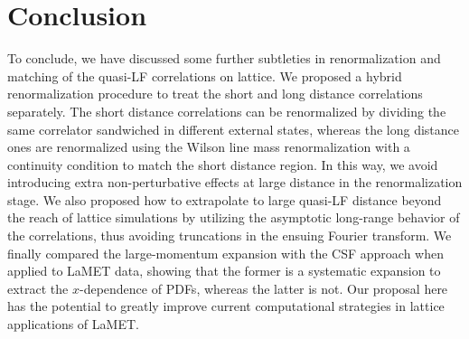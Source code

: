 \section{Conclusion}
\label{sec:conclusion}

To conclude, we have discussed some further subtleties in renormalization
and matching of the quasi-LF correlations on lattice. We proposed a hybrid renormalization procedure to treat the short and long distance correlations separately. The short distance correlations can be renormalized by dividing the same correlator sandwiched in different external states, whereas the long distance ones are renormalized using the Wilson line mass renormalization with a continuity condition to match the short distance region. In this way, we avoid introducing extra non-perturbative effects at large distance in the renormalization stage. We also proposed how to extrapolate to large quasi-LF distance beyond the reach of lattice simulations by utilizing the asymptotic long-range behavior of the correlations, thus avoiding truncations in the ensuing Fourier transform. We finally compared the large-momentum expansion with the CSF approach when applied to LaMET data, showing that the former is a systematic expansion to extract the $x$-dependence of PDFs, whereas the latter is not.
Our proposal here has the potential to greatly improve current computational strategies in lattice applications of LaMET.
